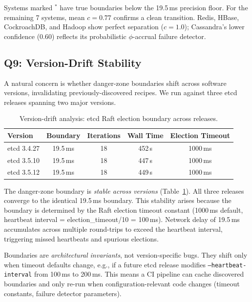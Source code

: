  Systems marked $^*$ have true boundaries below the
19.5\,ms precision floor. For the remaining 7 systems, mean $c = 0.77$
confirms a clean transition. Redis, HBase, CockroachDB, and Hadoop show
perfect separation ($c = 1.0$); Cassandra's lower confidence (0.60) reflects
its probabilistic $\phi$-accrual failure detector.

\subsection{Q9: Version-Drift Stability}
\label{sec:version-drift}

A natural concern is whether danger-zone boundaries shift across software
versions, invalidating previously-discovered recipes. We run \system{} against
three etcd releases spanning two major versions.

\begin{table}[t]
\centering
\caption{Version-drift analysis: etcd Raft election boundary across releases.}
\label{tab:version-drift}
\small
\begin{tabular}{lcccc}
\toprule
\textbf{Version} & \textbf{Boundary} & \textbf{Iterations} & \textbf{Wall Time} & \textbf{Election Timeout} \\
\midrule
etcd 3.4.27 & 19.5\,ms & 18 & 452\,s & 1000\,ms \\
etcd 3.5.10 & 19.5\,ms & 18 & 447\,s & 1000\,ms \\
etcd 3.5.12 & 19.5\,ms & 18 & 449\,s & 1000\,ms \\
\bottomrule
\end{tabular}
\end{table}

 The danger-zone boundary is \emph{stable across versions}
(Table~\ref{tab:version-drift}). All three releases converge to the identical
19.5\,ms boundary. This stability arises because the boundary is determined by
the Raft election timeout constant (1000\,ms default, heartbeat interval =
election\_timeout/10 = 100\,ms). Network delay of 19.5\,ms accumulates across
multiple round-trips to exceed the heartbeat interval, triggering missed
heartbeats and spurious elections.

 Boundaries are \emph{architectural invariants}, not
version-specific bugs. They shift only when timeout defaults change, e.g., if
a future etcd release modifies \texttt{--heartbeat-interval} from 100\,ms to
200\,ms. This means a CI pipeline can cache discovered boundaries and only
re-run \system{} when configuration-relevant code changes (timeout constants,
failure detector parameters).

